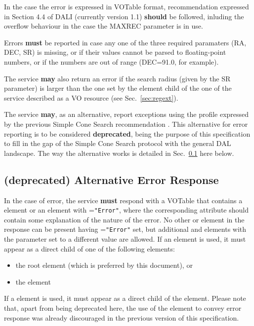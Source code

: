 \documentclass[11pt,a4paper]{ivoa}
\begin{document}
In the case the error is expressed in VOTable format, recommendation
expressed in Section 4.4 of DALI (currently version 1.1) \textbf{should}
be followed, inluding the overflow behaviour in the case the MAXREC
parameter is in use.

Errors \textbf{must} be reported in case any one of the three required
paramaters (RA, DEC, SR) is missing, or if their values cannot be parsed
to floating-point numbers, or if the numbers are out of range (DEC=91.0,
for example). 

The service \textbf{may} also return an error if the search radius
(given by the SR parameter) is larger than the one set by the
 element child of the  one of the service
described as a VO resource (see Sec.~\ref{sec:regext}).

The service \textbf{may}, as an alternative, report exceptions using the
profile expressed by the previous Simple Cone Search recommendation
\citep[v1.03]{std:SCS}. This alternative for error reporting is to be
considered \textbf{deprecated}, being the purpose of this specification
to fill in the gap of the Simple Cone Search protocol with the general
DAL landscape. The way the alternative works is detailed in
Sec.~\ref{subsec:err103} here below.

\subsection{(\textbf{deprecated}) Alternative Error Response}
\label{subsec:err103} In the case of error, the service \textbf{must}
respond with a VOTable that contains a  element or an
 element with =\texttt{"Error"}, where
the corresponding  attribute should contain some
explanation of the nature of the error. No other  or
 element in the response can be present having
=\texttt{"Error"} set, but additional  and
 elements with the  parameter set to a different value
are allowed. If an  element is
used, it must appear as a direct child of one of the following elements:
\begin{itemize} \item the root  element (which is
preferred by this document), or \item the  element
\end{itemize}

If a  element is used, it must appear as a direct child of
the  element.
Please note
that, apart from being deprecated here, the use of the 
element to convey error response was already discouraged in the previous
version of this specification.
\end{document}
